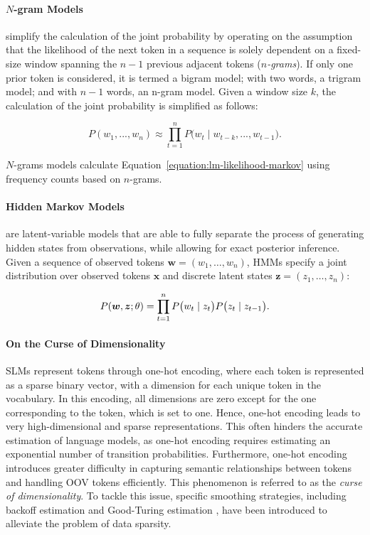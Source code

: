 \paragraph{$N$-gram Models} simplify the calculation of the joint probability by operating on the assumption that the likelihood of the next token in a sequence is solely dependent on a fixed-size window spanning the $n-1$ previous adjacent tokens (\textit{$n$-grams}). If only one prior token is considered, it is termed a bigram model; with two words, a trigram model; and with $n-1$ words, an n-gram model. Given a window size $k$, the calculation of the joint probability is simplified as follows:

\begin{equation}
    P(w_1, ..., w_n) \approx \prod_{t=1}^{n} P\bigl(w_t \mid w_{t-k}, ..., w_{t-1}\bigr).
    \label{equation:lm-likelihood-markov}
\end{equation}

$N$-grams models calculate Equation~\ref{equation:lm-likelihood-markov} using frequency counts based on $n$-grams. 

\paragraph{Hidden Markov Models} are latent-variable models that are able to fully separate the process of generating hidden states from observations, while allowing for exact posterior inference. Given a sequence of observed tokens $\bm{w} = (w_1, \ldots, w_n)$, \acp{HMM} specify a joint distribution over observed tokens $\bm{x}$ and discrete latent states $\bm{z} = (z_1, \ldots, z_n)$:

\begin{equation}
    P(\bm{w}, \bm{z}; \theta) = \prod_{t=1}^{n} P\bigl(w_t \mid z_t \bigr) P\bigl(z_t \mid z_{t-1} \bigr). \\
\end{equation}


\paragraph{On the Curse of Dimensionality} \acp{SLM} represent tokens through one-hot encoding, where each token is represented as a sparse binary vector, with a dimension for each unique token in the vocabulary. In this encoding, all dimensions are zero except for the one corresponding to the token, which is set to one. Hence, one-hot encoding leads to very high-dimensional and sparse representations. This often hinders the accurate estimation of language models, as one-hot encoding requires estimating an exponential number of transition probabilities. Furthermore, one-hot encoding introduces greater difficulty in capturing semantic relationships between tokens and handling \ac{OOV} tokens efficiently. This phenomenon is referred to as the \textit{curse of dimensionality}. To tackle this issue, specific smoothing strategies, including backoff estimation \citep{katz1987estimation} and Good-Turing estimation \citep{gale1995good}, have been introduced to alleviate the problem of data sparsity. \\

